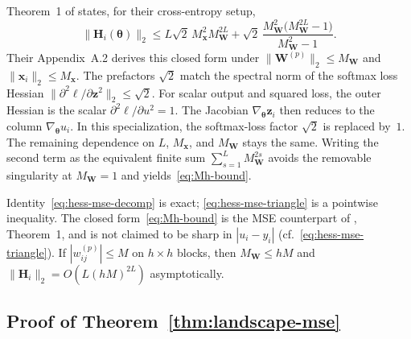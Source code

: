 \documentclass[10pt,letterpaper]{article}
\theoremstyle{definition}
\begin{document}
Theorem~1 of \cite{kiselev2024hessian} states, for their cross-entropy setup,
\[
  \|\mathbf{H}_i(\boldsymbol{\theta})\|_2
  \le L\sqrt{2}\,M_{\mathbf{x}}^2 M_{\mathbf{W}}^{2L}
  + \sqrt{2}\,\frac{M_{\mathbf{W}}^2\bigl(M_{\mathbf{W}}^{2L}-1\bigr)}{M_{\mathbf{W}}^2-1}.
\]
Their Appendix~A.2 derives this closed form under $\|\mathbf{W}^{(p)}\|_2\le M_{\mathbf{W}}$ and $\|\mathbf{x}_i\|_2\le M_{\mathbf{x}}$. The prefactors $\sqrt{2}$ match the spectral norm of the softmax loss Hessian $\|\partial^2\ell/\partial\mathbf{z}^2\|_2\le\sqrt{2}$.
For scalar output and squared loss, the outer Hessian is the scalar $\partial^2\ell/\partial u^2=1$. The Jacobian $\nabla_{\boldsymbol{\theta}}\mathbf{z}_i$ then reduces to the column $\nabla_{\boldsymbol{\theta}}u_i$. In this specialization, the softmax-loss factor $\sqrt{2}$ is replaced by~$1$. The remaining dependence on $L$, $M_{\mathbf{x}}$, and $M_{\mathbf{W}}$ stays the same. Writing the second term as the equivalent finite sum $\sum_{s=1}^{L} M_{\mathbf{W}}^{2s}$ avoids the removable singularity at $M_{\mathbf{W}}=1$ and yields~\eqref{eq:Mh-bound}.

Identity~\eqref{eq:hess-mse-decomp} is exact; \eqref{eq:hess-mse-triangle} is a pointwise inequality.
The closed form~\eqref{eq:Mh-bound} is the MSE counterpart of \cite{kiselev2024hessian}, Theorem~1, and is not claimed to be sharp in $|u_i-y_i|$ (cf.~\eqref{eq:hess-mse-triangle}).
If $|w_{ij}^{(p)}|\le M$ on $h\times h$ blocks, then $M_{\mathbf{W}}\le hM$ and $\|\mathbf{H}_i\|_2=O(L(hM)^{2L})$ asymptotically.

\subsection{Proof of Theorem~\ref{thm:landscape-mse}}\label{app:proof-thm-landscape}
\end{document}
